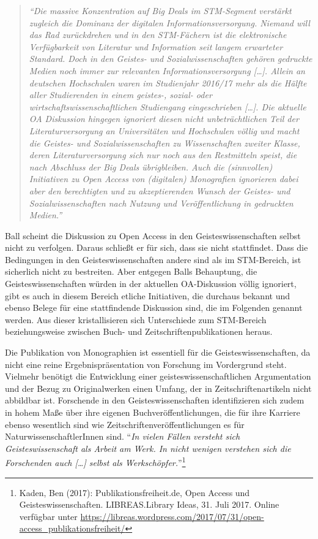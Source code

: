 \documentclass[a4paper,
fontsize=11pt,
oneside,
numbers=noperiodatend,
parskip=half-,
bibliography=totoc,
final
]{scrartcl}
\begin{document}
\begin{quote}
\emph{\enquote{Die massive Konzentration auf Big Deals im STM-Segment
verstärkt zugleich die Dominanz der digitalen Informationsversorgung.
Niemand will das Rad zurückdrehen und in den STM-Fächern ist die
elektronische Verfügbarkeit von Literatur und Information seit langem
erwarteter Standard. Doch in den Geistes- und Sozialwissenschaften
gehören gedruckte Medien noch immer zur relevanten
Informationsversorgung {[}\ldots{}{]}. Allein an deutschen Hochschulen
waren im Studienjahr 2016/17 mehr als die Hälfte aller Studierenden in
einem geistes-, sozial- oder wirtschaftswissenschaftlichen Studiengang
eingeschrieben {[}\ldots{}{]}. Die aktuelle OA Diskussion hingegen
ignoriert diesen nicht unbeträchtlichen Teil der Literaturversorgung an
Universitäten und Hochschulen völlig und macht die Geistes- und
Sozialwissenschaften zu Wissenschaften zweiter Klasse, deren
Literaturversorgung sich nur noch aus den Restmitteln speist, die nach
Abschluss der Big Deals übrigbleiben. Auch die (sinnvollen) Initiativen
zu Open Access von (digitalen) Monografien ignorieren dabei aber den
berechtigten und zu akzeptierenden Wunsch der Geistes- und
Sozialwissenschaften nach Nutzung und Veröffentlichung in gedruckten
Medien.}}
\end{quote}

Ball scheint die Diskussion zu Open Access in den Geisteswissenschaften
selbst nicht zu verfolgen. Daraus schließt er für sich, dass sie nicht
stattfindet. Dass die Bedingungen in den Geisteswissenschaften andere
sind als im STM-Bereich, ist sicherlich nicht zu bestreiten. Aber
entgegen Balls Behauptung, die Geisteswissenschaften würden in der
aktuellen OA-Diskussion völlig ignoriert, gibt es auch in diesem Bereich
etliche Initiativen, die durchaus bekannt und ebenso Belege für eine
stattfindende Diskussion sind, die im Folgenden genannt werden. Aus
dieser kristallisieren sich Unterschiede zum STM-Bereich beziehungsweise
zwischen Buch- und Zeitschriftenpublikationen heraus.

Die Publikation von Monographien ist essentiell für die
Geisteswissenschaften, da nicht eine reine Ergebnispräsentation von
Forschung im Vordergrund steht. Vielmehr benötigt die Entwicklung einer
geisteswissenschaftlichen Argumentation und der Bezug zu Originalwerken
einen Umfang, der in Zeitschriftenartikeln nicht abbildbar ist.
Forschende in den Geisteswissenschaften identifizieren sich zudem in
hohem Maße über ihre eigenen Buchveröffentlichungen, die für ihre
Karriere ebenso wesentlich sind wie Zeitschriftenveröffentlichungen es
für NaturwissenschaftlerInnen sind. \enquote{\emph{In vielen Fällen
versteht sich Geisteswissenschaft als Arbeit am Werk. In nicht wenigen
verstehen sich die Forschenden auch {[}\ldots{}{]} selbst als
Werkschöpfer.}}\footnote{Kaden, Ben (2017): Publikationsfreiheit.de,
  Open Access und Geisteswissenschaften. LIBREAS.Library Ideas, 31. Juli
  2017. Online verfügbar unter
  \url{https://libreas.wordpress.com/2017/07/31/open-access_publikationsfreiheit/}}
\end{document}
